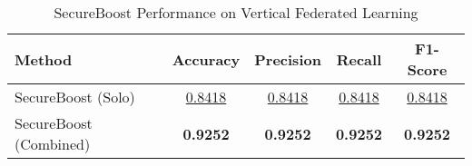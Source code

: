 \begin{table}[ht]
  \centering
  \caption{SecureBoost Performance on Vertical Federated Learning}
  \label{tab:secureboost_vertical_fl}
  \begin{tabular}{lcccc}
  \toprule
  \textbf{Method} & \textbf{Accuracy} & \textbf{Precision} & \textbf{Recall} & \textbf{F1-Score} \\
  \midrule
  SecureBoost (Solo) & \underline{0.8418} & \underline{0.8418} & \underline{0.8418} & \underline{0.8418} \\
  SecureBoost (Combined) & \textbf{0.9252} & \textbf{0.9252} & \textbf{0.9252} & \textbf{0.9252} \\
  \bottomrule
  \end{tabular}
\end{table}
